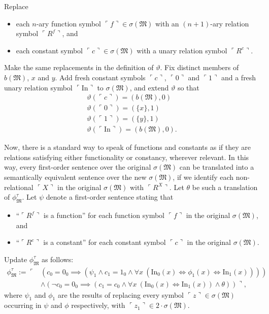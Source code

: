 \documentclass[12pt]{article}
\numberwithin{equation}{section}
\begin{document}
Replace
\begin{itemize}
    \item each $n$-ary function symbol $\ulcorner f \urcorner \in \sigma(\mathfrak{M})$ with an $(n+1)$-ary relation symbol $\ulcorner R^f \urcorner$, and
    \item each constant symbol $\ulcorner c \urcorner \in \sigma(\mathfrak{M})$ with a unary relation symbol $\ulcorner R^c \urcorner$.
\end{itemize}
Make the same replacements in the definition of $\vartheta$. Fix distinct members of $b(\mathfrak{M})$, $x$ and $y$. Add fresh constant symbols $\ulcorner c \urcorner$, $\ulcorner 0 \urcorner$ and $\ulcorner 1 \urcorner$ and a fresh unary relation symbol $\ulcorner \mathrm{In} \urcorner$ to $\sigma(\mathfrak{M})$, and extend $\vartheta$ so that
\begin{gather*}
    \vartheta(\ulcorner c \urcorner) = (b(\mathfrak{M}), 0) \\
    \vartheta(\ulcorner 0 \urcorner) = (\{x\}, 1) \\
    \vartheta(\ulcorner 1 \urcorner) = (\{y\}, 1) \\
    \vartheta(\ulcorner \mathrm{In} \urcorner) = (b(\mathfrak{M}), 0) \text{.}
\end{gather*}

Now, there is a standard way to speak of functions and constants as if they are relations satisfying either functionality or constancy, wherever relevant. In this way, every first-order sentence over the original $\sigma(\mathfrak{M})$ can be translated into a semantically equivalent sentence over the new $\sigma(\mathfrak{M})$, if we identify each non-relational $\ulcorner X \urcorner$ in the original $\sigma(\mathfrak{M})$ with $\ulcorner R^X \urcorner$. Let $\theta$ be such a translation of $\phi^{\tau}_{\mathfrak{M}}$. Let $\psi$ denote a first-order sentence stating that 
\begin{itemize}
    \item ``$\ulcorner R^f \urcorner$ is a function'' for each function symbol $\ulcorner f \urcorner$ in the original $\sigma(\mathfrak{M})$, and
    \item ``$\ulcorner R^c \urcorner$ is a constant'' for each constant symbol $\ulcorner c \urcorner$ in the original $\sigma(\mathfrak{M})$.
\end{itemize}
Update $\phi^{\tau}_{\mathfrak{M}}$ as follows: 
\begin{align*}
    \phi^{\tau}_{\mathfrak{M}} := \ulcorner & (c_0 = 0_0 \implies (\psi_1 \wedge c_1 = 1_0 \wedge \forall x \ (\mathrm{In}_0 (x) \iff \phi_1 (x) \iff \mathrm{In}_1 (x)))) \\
    & \wedge (\neg c_0 = 0_0 \implies (c_1 = c_0 \wedge \forall x \ (\mathrm{In}_0 (x) \iff \mathrm{In}_1 (x)) \wedge \theta)) \urcorner \text{,}
\end{align*}
where $\psi_1$ and $\phi_1$ are the results of replacing every symbol $\ulcorner z \urcorner \in \sigma(\mathfrak{M})$ occurring in $\psi$ and $\phi$ respectively, with $\ulcorner z_1 \urcorner \in 2 \cdot \sigma(\mathfrak{M})$. 
\end{document}
